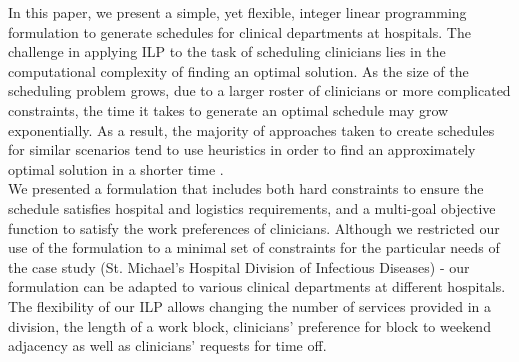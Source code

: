 In this paper, we present a simple, yet flexible, integer linear programming formulation to generate schedules for clinical departments at hospitals.
The challenge in applying ILP to the task of scheduling clinicians lies in the computational complexity of finding an optimal solution. As the size of the scheduling problem grows, due to a larger roster of clinicians or more complicated constraints, the time it takes to generate an optimal schedule may grow exponentially.
As a result, the majority of approaches taken to create schedules for similar scenarios tend to use heuristics in order to find an approximately optimal solution in a shorter time \cite{burke_state_2004}. \\  %


We presented a formulation that includes both hard constraints to ensure the schedule satisfies hospital and logistics requirements, and a multi-goal objective function to satisfy the work preferences of clinicians.
Although we restricted our use of the formulation to a minimal set of constraints for the particular needs of the case study (St. Michael's Hospital Division of Infectious Diseases) - our formulation can be adapted to various clinical departments at different hospitals. The flexibility of our ILP allows changing the number of services provided in a division, the length of a work block, clinicians' preference for block to weekend adjacency as well as clinicians' requests for time off. \\

